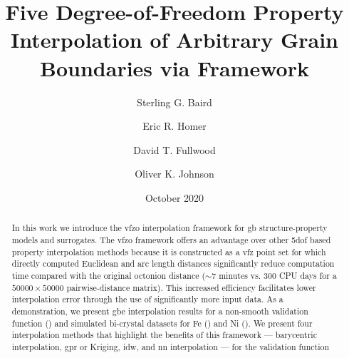 \documentclass[final,twocolumn,12pt]{elsarticle}
\newcommand{\baryrmse}{0.0238}
\newcommand{\gprrmse}{0.0218}
\newcommand{\idwrmse}{0.0356}
\newcommand{\nnrmse}{0.0445}
\newcommand{\avgrmse}{0.1283}
\begin{document}
\begin{frontmatter}

\title{Five Degree-of-Freedom Property Interpolation of Arbitrary Grain Boundaries via  Framework}

\author[myu]{Sterling G. Baird}
\author[myu]{Eric R. Homer}
\author[myu]{David T. Fullwood}
\author[myu]{Oliver K. Johnson}

\address[myu]{Department of Mechanical Engineering, Brigham Young University, Provo, UT 84602, USA}


\date{October 2020}

\begin{abstract}
    In this work we introduce the \gls{vfzo} interpolation framework for \gls{gb} structure-property models and surrogates. The \gls{vfzo} framework offers an advantage over other \gls{5dof} based property interpolation methods because it is constructed as a \gls{vfz} point set %
    for which directly computed Euclidean and arc length distances significantly reduce computation time compared with the original octonion distance ($\sim$7 minutes vs. \num{300} CPU days for a $\num{50000}\times\num{50000}$ pairwise-distance matrix). %
    This increased efficiency facilitates lower interpolation error through the use of significantly more input data.
    As a demonstration, we present \gls{gbe} interpolation results for a non-smooth validation function (\citet{bulatovGrainBoundaryEnergy2014}) and simulated bi-crystal datasets for Fe (\citet{kimPhasefieldModeling3D2014}) and Ni (\citet{olmstedSurveyComputedGrain2009}).
    We present four interpolation methods that highlight the benefits of this framework --- barycentric interpolation, \gls{gpr} or Kriging, \gls{idw}, and \gls{nn} interpolation --- for the validation function %

\end{abstract}
\end{frontmatter}
\end{document}
